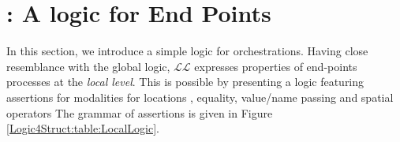 \section{\texorpdfstring{\LL:}{LL:}  A logic for End Points}
\label{Logic4Struct:sec:localLogic}
In this section, we introduce a simple logic for
orchestrations. Having close resemblance with the global logic,
$\mathcal{LL}$ expresses properties of end-points processes at the
\emph{local level}.  This is possible by presenting a logic featuring
assertions for modalities for locations
\cite{Cardelli2006Ambient-Logic}, equality, value/name
passing and  
 spatial operators \cite{caires2001spatial}
The grammar of assertions is given in Figure
\ref{Logic4Struct:table:LocalLogic}.
